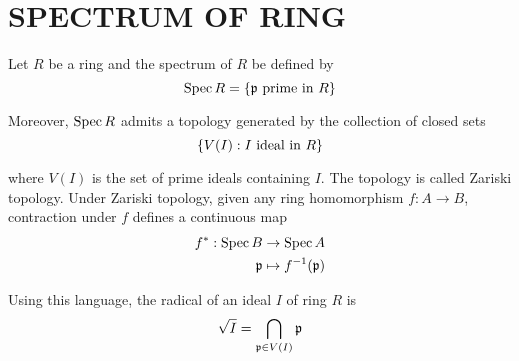 \section{SPECTRUM OF RING}

\begin{definition}
	Let $R$ be a ring and the spectrum of $R$ be defined by
	$$
		\operatorname{Spec} R = \{\mathfrak{p} \text{ prime in } R\}
	$$

	Moreover, $\operatorname{Spec} R$ admits a topology generated by the collection of closed sets
	$$
		\{V(I): I \text{ ideal in } R\}
	$$
	
	where $V(I)$ is the set of prime ideals containing $I$. The topology is called Zariski topology. Under Zariski topology, given any ring homomorphism $f: A \to B$, contraction under $f$ defines a continuous map
	\begin{align*}
		f^*: \operatorname{Spec} B &\to \operatorname{Spec} A \\
				\mathfrak{p} &\mapsto f^{-1}(\mathfrak{p})
	\end{align*}
\end{definition}

\begin{remark}
	Using this language, the radical of an ideal $I$ of ring $R$ is
	$$
		\sqrt{I} = \bigcap_{\mathfrak{p} \in V(I)} \mathfrak{p}
	$$
\end{remark}

